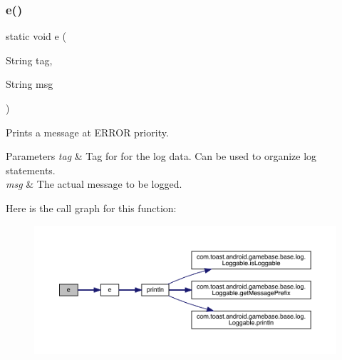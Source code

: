 \subsubsection{\texorpdfstring{e()}{e()}\hspace{0.1cm}{\footnotesize\ttfamily [2/2]}}
{\footnotesize\ttfamily static void e (\begin{DoxyParamCaption}\item[{String}]{tag,  }\item[{String}]{msg }\end{DoxyParamCaption})\hspace{0.3cm}{\ttfamily [static]}}



Prints a message at E\+R\+R\+OR priority. 


\begin{DoxyParams}{Parameters}
{\em tag} & Tag for for the log data. Can be used to organize log statements. \\
\hline
{\em msg} & The actual message to be logged. \\
\hline
\end{DoxyParams}
Here is the call graph for this function\+:
\nopagebreak
\begin{figure}[H]
\begin{center}
\leavevmode
\includegraphics[width=350pt]{classcom_1_1toast_1_1android_1_1gamebase_1_1base_1_1log_1_1_logger_a98ed530e788c0a6fef1e9b951d3693f9_cgraph}
\end{center}
\end{figure}
\mbox{\label{classcom_1_1toast_1_1android_1_1gamebase_1_1base_1_1log_1_1_logger_a060b9eca800cda8aa51f3bd02abd9263}} 
